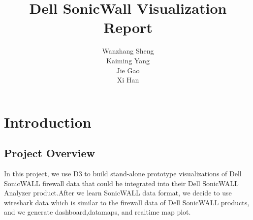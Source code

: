 \documentclass[paper=a4, fontsize=11pt]{report} %
\title{Dell SonicWall Visualization Report}
\author{
Wanzhang Sheng\\
Kaiming Yang\\
Jie Gao\\
Xi Han
}
\begin{document}
\maketitle


\chapter{Introduction} %
\label{cha:introduction}

\section{Project Overview} %
\label{sec:project_overview}
In this project, we use D3 to build stand-alone prototype visualizations of Dell SonicWALL firewall
data that could be integrated into their Dell SonicWALL Analyzer product.After we learn SonicWALL
data format, we decide to  use wireshark data which is similar to the firewall data of Dell
SonicWALL products, and we generate dashboard,datamaps, and realtime map plot.
\end{document}

